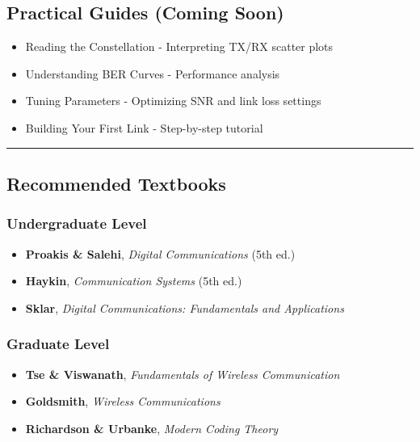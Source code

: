 \subsection{\texorpdfstring{ Practical Guides (Coming
Soon)}{ Practical Guides (Coming Soon)}}\label{practical-guides-coming-soon}

\begin{itemize}
\tightlist
\item
  Reading the Constellation - Interpreting TX/RX scatter plots
\item
  Understanding BER Curves - Performance analysis
\item
  Tuning Parameters - Optimizing SNR and link loss settings
\item
  Building Your First Link - Step-by-step tutorial
\end{itemize}

\begin{center}\rule{0.5\linewidth}{0.5pt}\end{center}

\subsection{\texorpdfstring{ Recommended
Textbooks}{ Recommended Textbooks}}\label{recommended-textbooks}

\subsubsection{Undergraduate Level}\label{undergraduate-level}

\begin{itemize}
\tightlist
\item
  \textbf{Proakis \& Salehi}, \emph{Digital Communications} (5th ed.)
\item
  \textbf{Haykin}, \emph{Communication Systems} (5th ed.)
\item
  \textbf{Sklar}, \emph{Digital Communications: Fundamentals and
  Applications}
\end{itemize}

\subsubsection{Graduate Level}\label{graduate-level}

\begin{itemize}
\tightlist
\item
  \textbf{Tse \& Viswanath}, \emph{Fundamentals of Wireless
  Communication}
\item
  \textbf{Goldsmith}, \emph{Wireless Communications}
\item
  \textbf{Richardson \& Urbanke}, \emph{Modern Coding Theory}
\end{itemize}

